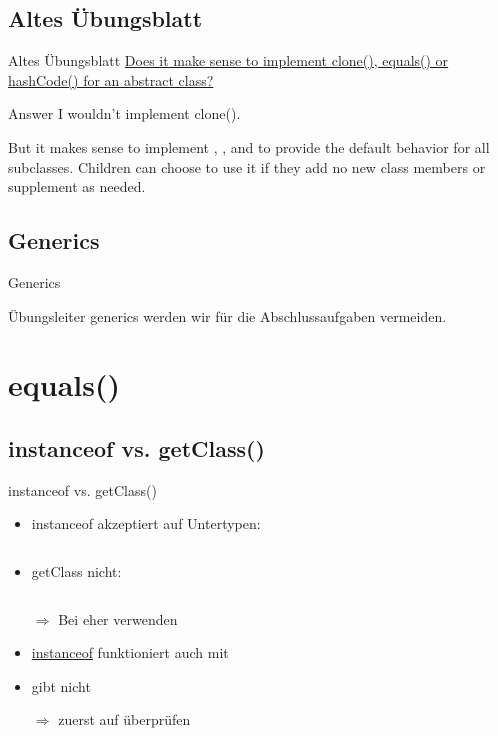 \documentclass[usepdftitle=false,hyperref={pdfpagelabels=false}]{beamer}
\begin{document}
\subsection{Altes Übungsblatt}
\begin{frame}{Altes Übungsblatt}
   \href{http://stackoverflow.com/q/14200941/562769}{Does it make sense to implement clone(), equals() or hashCode() for an abstract class?}

    \begin{block}{Answer}
        I wouldn't implement clone().

        But it makes sense to implement , 
        , and 
         to provide the default behavior for all subclasses. 
        Children can choose to use it if they add no new class 
        members or supplement as needed.
    \end{block}
\end{frame}

\subsection{Generics}
\begin{frame}{Generics}
   \begin{block}{Übungsleiter}
        generics werden wir für die Abschlussaufgaben vermeiden.
    \end{block}
\end{frame}

\section{equals()}
\subsection{instanceof vs. getClass()}
\begin{frame}{instanceof vs. getClass()}
    \begin{itemize}[<+->]
        \item instanceof akzeptiert auf Untertypen:
              \inputminted[linenos=false, numbersep=5pt, tabsize=4, fontsize=\tiny, firstline=8, lastline=15]{java}{singleLines.java}
        \item getClass nicht:
              \inputminted[linenos=false, numbersep=5pt, tabsize=4, fontsize=\tiny, firstline=17, lastline=18]{java}{singleLines.java}
        \item[$\Rightarrow$] Bei  eher  verwenden
        \item \href{http://docs.oracle.com/javase/specs/jls/se7/html/jls-15.html\#jls-15.20.2}{instanceof} funktioniert auch mit 
        \item {} gibt  nicht
        \item[$\Rightarrow$] zuerst auf  überprüfen
    \end{itemize}
\end{frame}
\end{document}
